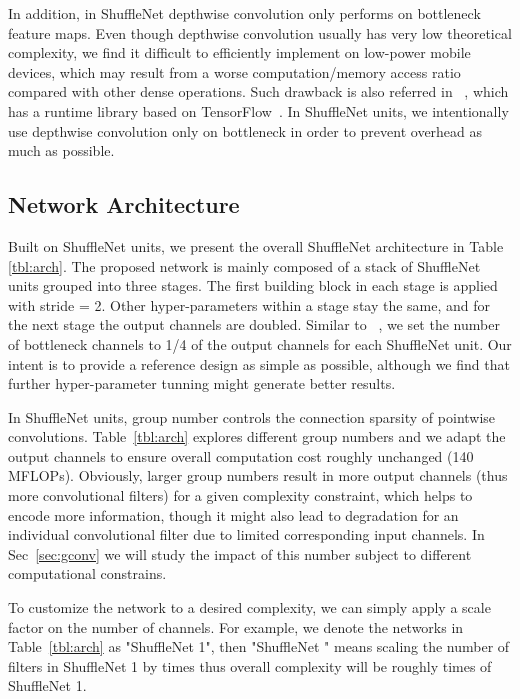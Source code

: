 \documentclass[10pt,twocolumn,letterpaper]{article}
\begin{document}
In addition, in ShuffleNet depthwise convolution only performs on bottleneck feature maps. Even though depthwise convolution usually has very low theoretical complexity, we find it difficult to efficiently implement on low-power mobile devices, which may result from a worse computation/memory access ratio compared with other dense operations. Such drawback is also referred in ~\cite{chollet2016xception}, which has a runtime library based on TensorFlow~\cite{abadi2016tensorflow}. In ShuffleNet units, we intentionally use depthwise convolution only on bottleneck in order to prevent overhead as much as possible.


\subsection{Network Architecture}

Built on ShuffleNet units, we present the overall ShuffleNet architecture in Table \ref{tbl:arch}. The proposed network is mainly composed of a stack of ShuffleNet units grouped into three stages. The first building block in each stage is applied with stride = 2. Other hyper-parameters within a stage stay the same, and for the next stage the output channels are doubled. Similar to ~\cite{he2016deep}, we set the number of bottleneck channels to 1/4 of the output channels for each ShuffleNet unit. Our intent is to provide a reference design as simple as possible, although we find that further hyper-parameter tunning might generate better results. 



In ShuffleNet units, group number  controls the connection sparsity of pointwise convolutions. Table~\ref{tbl:arch} explores different group numbers and we adapt the output channels to ensure overall computation cost roughly unchanged (140 MFLOPs). Obviously, larger group numbers result in more output channels (thus more convolutional filters) for a given complexity constraint, which helps to encode more information, though it might also lead to degradation for an individual convolutional filter due to limited corresponding input channels. In Sec~\ref{sec:gconv} we will study the impact of this number subject to different computational constrains.

To customize the network to a desired complexity, we can simply apply a scale factor  on the number of channels. For example, we denote the networks in Table~\ref{tbl:arch} as "ShuffleNet 1", then "ShuffleNet " means scaling the number of filters in ShuffleNet 1 by  times thus overall complexity will be roughly  times of ShuffleNet 1. 
\end{document}
